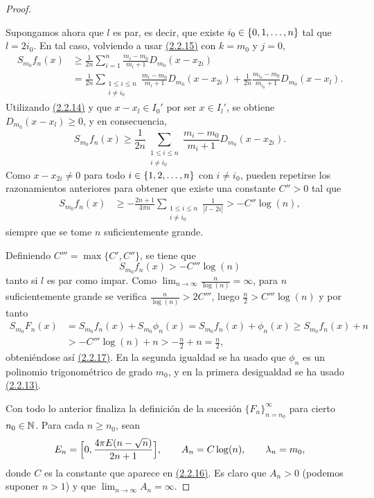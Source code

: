 \documentclass[a4paper, 12pt, oneside]{book}
\begin{document}
\begin{proof}
\begin{itemize}
        Supongamos ahora que $l$ es par, es decir, que existe $i_0 \in \{0,1,\mathellipsis,n\}$ tal que $l = 2i_0$. En tal caso, volviendo a usar \hyperref[2.2.15]{\color{blue}(2.2.15)} con $k = m_0$ y $j = 0$,
        \begin{align*}
            S_{m_0}f_n(x) &\geq \frac{1}{2n}\sum_{i=1}^n \frac{m_i-m_0}{m_i+1}D_{m_0}(x-x_{2i}) \\
            &=\frac{1}{2n}\sum_{\substack{1 \leq i \leq n \\ i \neq i_0}} \frac{m_i-m_0}{m_i+1}D_{m_0}(x-x_{2i})+\frac{1}{2n}\frac{m_{i_0}-m_0}{m_{i_0}+1}D_{m_0}(x-x_l).
        \end{align*}
        Utilizando \hyperref[2.2.14]{\color{blue}(2.2.14)} y que $x-x_l \in I_0'$ por ser $x \in I_l'$, se obtiene $D_{m_0}(x-x_l) \geq 0$, y en consecuencia,
        \[S_{m_0}f_n(x) \geq \frac{1}{2n}\sum_{\substack{1 \leq i \leq n \\ i \neq i_0}} \frac{m_i-m_0}{m_i+1}D_{m_0}(x-x_{2i}).\]
        Como $x-x_{2i} \neq 0$ para todo $i \in \{1,2,\mathellipsis,n\}$ con $i \neq i_0$, pueden repetirse los razonamientos anteriores para obtener que existe una constante $C'' > 0$ tal que
        \begin{align*}
            S_{m_0}f_n(x) &\geq -\frac{2n+1}{4\pi n}\sum_{\substack{1 \leq i \leq n \\ i \neq i_0}} \frac{1}{|l-2i|} > -C''\log(n),
        \end{align*}
        siempre que se tome $n$ suficientemente grande.

        Definiendo $C''' = \max\{C',C''\}$, se tiene que 
        \[S_{m_0}f_n(x) > -C'''\log(n)\] tanto si $l$ es par como impar. Como $\lim_{n \to \infty} \frac{n}{\log(n)} = \infty$, para $n$ suficientemente grande se verifica $\frac{n}{\log(n)}>2C'''$,
        luego $\frac{n}{2} > C'''\log(n)$ y por tanto 
        \begin{align*}
            S_{m_0}F_n(x) &= S_{m_0}f_n(x)+S_{m_0}\phi_n(x) = S_{m_0}f_n(x)+\phi_n(x) \geq S_{m_0}f_n(x)+n \\
            &> -C'''\log(n)+n > -\frac{n}{2}+n = \frac{n}{2},
        \end{align*}
        obteniéndose así \hyperref[2.2.17]{\color{blue}(2.2.17)}. En la segunda igualdad se ha usado que $\phi_n$ es un polinomio trigonométrico de grado $m_0$, y en la primera desigualdad se ha usado \hyperref[2.2.13]{\color{blue}(2.2.13)}.
    \end{itemize}

    Con todo lo anterior finaliza la definición de la sucesión $\{F_n\}_{n=n_0}^\infty$ para cierto $n_0\in\mathbb N$. Para cada $n \geq n_0$, sean
    \[E_n = \Bigl[0, \frac{4\pi E(n-\sqrt{n})}{2n+1}\Bigr], \qquad A_n = C\log(n), \qquad \lambda_n = m_0,\]
    donde $C$ es la constante que aparece en \hyperref[2.2.16]{\color{blue}(2.2.16)}. Es claro que $A_n > 0$ (podemos suponer $n>1$) y que $\lim_{n \to \infty} A_n = \infty$.
    

\end{proof}
\end{document}
